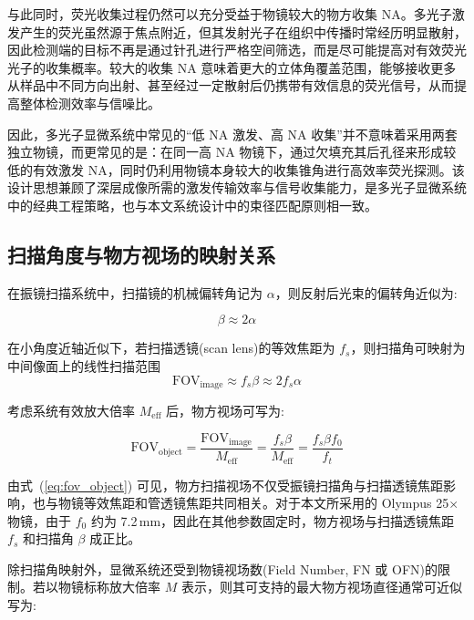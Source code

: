 与此同时，荧光收集过程仍然可以充分受益于物镜较大的物方收集 NA。多光子激发产生的荧光虽然源于焦点附近，但其发射光子在组织中传播时常经历明显散射，因此检测端的目标不再是通过针孔进行严格空间筛选，而是尽可能提高对有效荧光光子的收集概率。较大的收集 NA 意味着更大的立体角覆盖范围，能够接收更多从样品中不同方向出射、甚至经过一定散射后仍携带有效信息的荧光信号，从而提高整体检测效率与信噪比。

因此，多光子显微系统中常见的``低 NA 激发、高 NA 收集''并不意味着采用两套独立物镜，而更常见的是：在同一高 NA 物镜下，通过欠填充其后孔径来形成较低的有效激发 NA，同时仍利用物镜本身较大的收集锥角进行高效率荧光探测。该设计思想兼顾了深层成像所需的激发传输效率与信号收集能力，是多光子显微系统中的经典工程策略，也与本文系统设计中的束径匹配原则相一致。




\subsection{扫描角度与物方视场的映射关系}\label{2.4.3}

在振镜扫描系统中，扫描镜的机械偏转角记为 $\alpha$，则反射后光束的偏转角近似为:

\begin{equation}
  \beta \approx 2\alpha
  \label{eq:beta_alpha}
\end{equation}

在小角度近轴近似下，若扫描透镜(scan lens)的等效焦距为 $f_s$，则扫描角可映射为中间像面上的线性扫描范围
\begin{equation}
  \mathrm{FOV}_{\mathrm{image}}\approx f_s\beta \approx 2f_s\alpha
  \label{eq:fov_image}
\end{equation}

考虑系统有效放大倍率 $M_{\mathrm{eff}}$ 后，物方视场可写为:

\begin{equation}
  \mathrm{FOV}_{\mathrm{object}}
  =\frac{\mathrm{FOV}_{\mathrm{image}}}{M_{\mathrm{eff}}}
  =\frac{f_s\beta}{M_{\mathrm{eff}}}
  =\frac{f_s\beta f_0}{f_t}
  \label{eq:fov_object}
\end{equation}

由式~(\ref{eq:fov_object}) 可见，物方扫描视场不仅受振镜扫描角与扫描透镜焦距影响，也与物镜等效焦距和管透镜焦距共同相关。对于本文所采用的 Olympus 25$\times$ 物镜，由于 $f_0$ 约为 7.2\,mm，因此在其他参数固定时，物方视场与扫描透镜焦距 $f_s$ 和扫描角 $\beta$ 成正比。

除扫描角映射外，显微系统还受到物镜视场数(Field Number, FN 或 OFN)的限制。若以物镜标称放大倍率 $M$ 表示，则其可支持的最大物方视场直径通常可近似写为:


